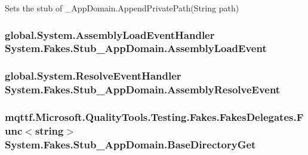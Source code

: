 Sets the stub of \-\_\-\-App\-Domain.\-Append\-Private\-Path(\-String path)

\hypertarget{class_system_1_1_fakes_1_1_stub___app_domain_a494b8812819afdf2415fbf3a601d9b17}{
\subsubsection[{Assembly\-Load\-Event}]{\setlength{\rightskip}{0pt plus 5cm}global.\-System.\-Assembly\-Load\-Event\-Handler System.\-Fakes.\-Stub\-\_\-\-App\-Domain.\-Assembly\-Load\-Event}}\label{class_system_1_1_fakes_1_1_stub___app_domain_a494b8812819afdf2415fbf3a601d9b17}
\hypertarget{class_system_1_1_fakes_1_1_stub___app_domain_a6bb05b68ba75d97e1c3188ede5af4e98}{
\subsubsection[{Assembly\-Resolve\-Event}]{\setlength{\rightskip}{0pt plus 5cm}global.\-System.\-Resolve\-Event\-Handler System.\-Fakes.\-Stub\-\_\-\-App\-Domain.\-Assembly\-Resolve\-Event}}\label{class_system_1_1_fakes_1_1_stub___app_domain_a6bb05b68ba75d97e1c3188ede5af4e98}
\hypertarget{class_system_1_1_fakes_1_1_stub___app_domain_a4417b47dd13981f19e2dfaabcccc09eb}{
\subsubsection[{Base\-Directory\-Get}]{\setlength{\rightskip}{0pt plus 5cm}mqttf.\-Microsoft.\-Quality\-Tools.\-Testing.\-Fakes.\-Fakes\-Delegates.\-Func$<$string$>$ System.\-Fakes.\-Stub\-\_\-\-App\-Domain.\-Base\-Directory\-Get}}\label{class_system_1_1_fakes_1_1_stub___app_domain_a4417b47dd13981f19e2dfaabcccc09eb}


